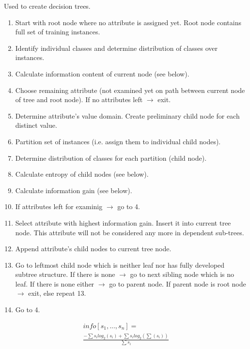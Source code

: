 \begin{breakbox}
Used to create decision trees.
\begin{enumerate}
	\item Start with root node where no attribute is assigned yet. Root node contains full set of training instances.
	\item Identify individual classes and determine distribution of classes over instances.
	\item Calculate information content of current node (see below).
	\item Choose remaining attribute (not examined yet on path between current node of tree and root node). If no attributes left $\rightarrow$ exit.
	\item Determine attribute's value domain. Create preliminary child node for each distinct value.
	\item Partition set of instances (i.e. assign them to individual child nodes).
	\item Determine distribution of classes for each partition (child node).
	\item Calculate entropy of child nodes (see below).
	\item Calculate information gain (see below).
	\item If attributes left for examinig $\rightarrow$ go to 4.
	\item Select attribute with highest information gain. Insert it into current tree node. This attribute will not be considered any more in dependent sub-trees.
	\item Append attribute's child nodes to current tree node.
	\item Go to leftmost child node which is neither leaf nor has fully developed subtree structure. If there is none $\rightarrow$ go to next sibling node which is no leaf. If there is none either $\rightarrow$ go to parent node. If parent node is root node $\rightarrow$ exit, else repeat 13.
	\item Go to 4.
\end{enumerate}

\begin{breakbox}
\begin{align*}
info[s_1, ..., s_n]=\\
\frac{-\sum s_i log_2(s_i)+ \sum s_i log_2(\sum(s_i))}{\sum{s_i}}
\end{align*}
\end{breakbox}


\end{breakbox}
